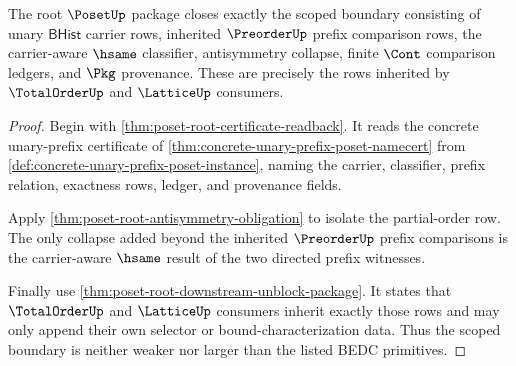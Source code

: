 \begin{theorem}
\label{thm:poset-root-scoped-certificate-boundary}
The root $\PosetUp$ package closes exactly the scoped boundary consisting of
unary $\mathsf{BHist}$ carrier rows, inherited $\PreorderUp$ prefix comparison
rows, the carrier-aware $\hsame$ classifier, antisymmetry collapse, finite
$\Cont$ comparison ledgers, and $\Pkg$ provenance. These are precisely the
rows inherited by $\TotalOrderUp$ and $\LatticeUp$ consumers.
\end{theorem}
\begin{proof}
Begin with \autoref{thm:poset-root-certificate-readback}. It reads the concrete
unary-prefix certificate of \autoref{thm:concrete-unary-prefix-poset-namecert}
from \autoref{def:concrete-unary-prefix-poset-instance}, naming the carrier,
classifier, prefix relation, exactness rows, ledger, and provenance fields.

Apply \autoref{thm:poset-root-antisymmetry-obligation} to isolate the
partial-order row. The only collapse added beyond the inherited
$\PreorderUp$ prefix comparisons is the carrier-aware $\hsame$ result of the
two directed prefix witnesses.

Finally use \autoref{thm:poset-root-downstream-unblock-package}. It states that
$\TotalOrderUp$ and $\LatticeUp$ consumers inherit exactly those rows and may
only append their own selector or bound-characterization data. Thus the scoped
boundary is neither weaker nor larger than the listed BEDC primitives.
\end{proof}
